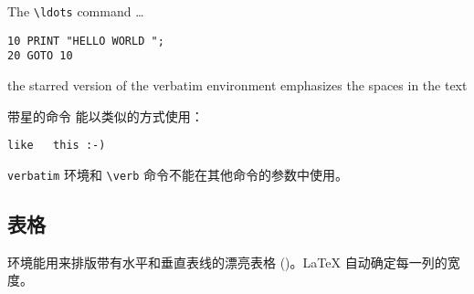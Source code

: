 \begin{example}
The \verb|\ldots| command \ldots
\begin{verbatim}
10 PRINT "HELLO WORLD ";
20 GOTO 10
\end{verbatim}
\end{example}

\begin{example}
\begin{verbatim*}
the starred version of
the      verbatim
environment emphasizes
the spaces   in the text
\end{verbatim*}
\end{example}

带星的命令  能以类似的方式使用：

\begin{example}
\verb*|like   this :-) |
\end{example}

\texttt{verbatim} 环境和 \verb|\verb| 命令不能在其他命令的参数中使用。

%

\subsection{表格}

\newcommand{\mfr}[1]{\framebox{\rule{0pt}{0.7em}\texttt{#1}}}

 环境能用来排版带有水平和垂直表线的漂亮表格 ()。\LaTeX{} 自动确定每一列的宽度。

